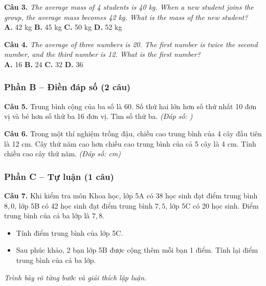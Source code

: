 \documentclass[../main.tex]{subfiles}
\begin{document}
\medskip
\textbf{Câu 3.} \textit{The average mass of 4 students is 40 kg. When a new student joins the group, the average mass becomes 42 kg. What is the mass of the new student?}\\
\textbf{A.} 42 kg \qquad \textbf{B.} 45 kg \qquad \textbf{C.} 50 kg \qquad \textbf{D.} 52 kg

\medskip
\textbf{Câu 4.} \textit{The average of three numbers is 20. The first number is twice the second number, and the third number is 12. What is the first number?}\\
\textbf{A.} 16 \qquad \textbf{B.} 24 \qquad \textbf{C.} 32 \qquad \textbf{D.} 36

\subsubsection{Phần B -- Điền đáp số (2 câu)}
\textbf{Câu 5.} Trung bình cộng của ba số là 60. Số thứ hai lớn hơn số thứ nhất 10 đơn vị và bé hơn số thứ ba 16 đơn vị. Tìm số thứ ba. \textit{(Đáp số: \makebox[2cm]{\dotfill})}

\medskip
\textbf{Câu 6.} Trong một thí nghiệm trồng đậu, chiều cao trung bình của 4 cây đầu tiên là 12 cm. Cây thứ năm cao hơn chiều cao trung bình của cả 5 cây là 4 cm. Tính chiều cao cây thứ năm. \textit{(Đáp số: \makebox[2cm]{\dotfill} cm)}

\subsubsection{Phần C -- Tự luận (1 câu)}
\textbf{Câu 7.} Khi kiểm tra môn Khoa học, lớp 5A có 38 học sinh đạt điểm trung bình $8{,}0$, lớp 5B có 42 học sinh đạt điểm trung bình $7{,}5$, lớp 5C có 20 học sinh. Điểm trung bình của cả ba lớp là $7{,}8$.
\begin{itemize}
    \item[a)] Tính điểm trung bình của lớp 5C.
    \item[b)] Sau phúc khảo, 2 bạn lớp 5B được cộng thêm mỗi bạn 1 điểm. Tính lại điểm trung bình của cả ba lớp.
\end{itemize}
\textit{Trình bày rõ từng bước và giải thích lập luận.}

\end{document}
